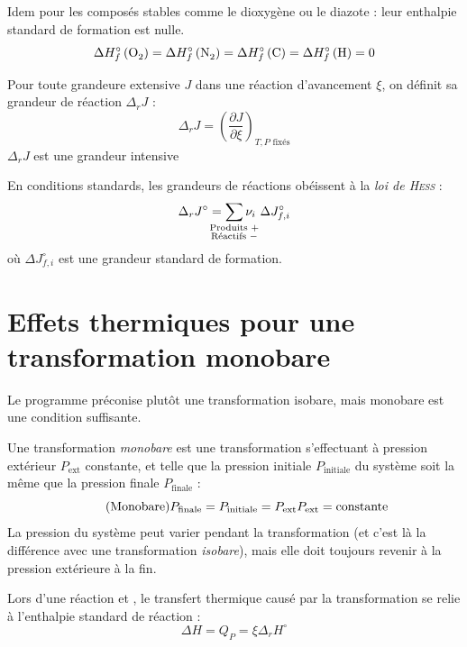 \documentclass[11pt,a4paper,fleqn,pdftex]{report}
\begin{document}
Idem pour les composés stables comme le dioxygène  ou le diazote  : leur enthalpie standard de formation est nulle.
\[
  \Delta H_f^\circ \left( \ce{O2}\right) = \Delta H_f^\circ \left( \ce{N2}\right) = \Delta H_f^\circ \left( \ce{C}\right) = \Delta H_f^\circ \left( \ce{H}\right) = 0
\]
\begin{dfn}
  Pour toute grandeure extensive $J$ dans une réaction d'avancement $\xi$, on définit sa grandeur de réaction $\Delta_r J$ : 
  \begin{equation}
  \Delta_r J = \left( \dfrac{\partial J}{\partial \xi} \right)_{\text{$T,P$ fixés}}
  \end{equation}
  $\Delta_r J$ est une grandeur intensive
\end{dfn}
\begin{itheorem}[Loi de \textsc{Hess}] %
En conditions standards, les grandeurs de réactions obéissent à la \emph{loi de \textsc{Hess}} : 
  \begin{equation}
    \Delta_r J^\circ = \sum_{\mathclap{\substack{\text{Produits }+\\ \text{Réactifs }-}}} \nu_i~\Delta J^\circ_{f,i}
  \end{equation}
  où $\Delta J^\circ_{f,i}$ est une grandeur standard de formation.
\end{itheorem}
\section{Effets thermiques pour une transformation monobare} %
\label{sec:effets_thermiques_pour_une_transformation_monobare}
Le programme préconise plutôt une transformation isobare, mais monobare est une condition suffisante. %
\begin{dfn}
   Une transformation \emph{monobare} est une transformation s'effectuant à pression extérieur $P_\text{ext}$ constante, et telle que la pression initiale $P_\text{initiale}$ du système soit la même que la pression finale $P_\text{finale}$ : 
   \begin{equation}\label{eq:dfn:monobare}\tag{Monobare}
     P_\text{finale} = P_\text{initiale} = P_\text{ext} \\ P_\text{ext} = \text{constante}
   \end{equation}
   La pression du système peut varier pendant la transformation (et c'est là la différence avec une transformation \emph{isobare}), mais elle doit toujours revenir à la pression extérieure à la fin.
\end{dfn}
\begin{theorem}
   Lors d'une réaction  et , le transfert thermique causé par la transformation se relie à l'enthalpie standard de réaction : 
   \begin{equation}
   \Delta H = Q_P = \xi \Delta_r H^\circ
   \end{equation}
   
\end{theorem}
\end{document}
